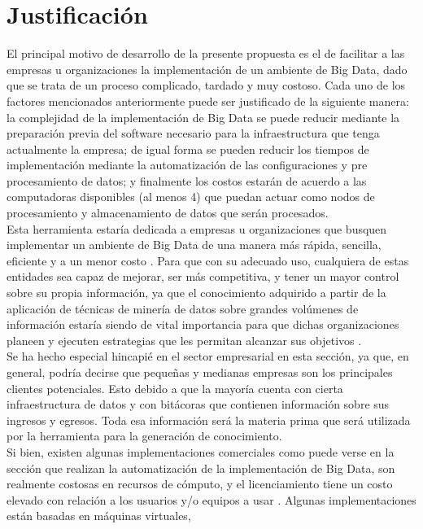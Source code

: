\section{Justificación}
El principal motivo de desarrollo de la presente propuesta es el de facilitar a las empresas u organizaciones la implementación de
un ambiente de Big Data, dado que se trata de un proceso complicado, tardado y muy costoso. Cada uno de los
factores mencionados anteriormente puede ser justificado de la siguiente manera: la complejidad de la implementación de Big Data
se puede reducir mediante la preparación previa del software necesario para la infraestructura que tenga actualmente la empresa; de
igual forma se pueden reducir los tiempos de implementación mediante la automatización de las configuraciones y pre
procesamiento de datos; y finalmente los costos estarán de acuerdo a las computadoras disponibles (al menos 4) que puedan actuar
como nodos de procesamiento y almacenamiento de datos que serán procesados.
\\
Esta herramienta estaría dedicada a empresas u organizaciones que busquen implementar un ambiente de Big Data de una manera
más rápida, sencilla, eficiente y a un menor costo \cite{refi8}. Para que con su adecuado uso, cualquiera de estas entidades sea capaz de
mejorar, ser más competitiva, y tener un mayor control sobre su propia información, ya que el conocimiento adquirido a partir de
la aplicación de técnicas de minería de datos sobre grandes volúmenes de información estaría siendo de vital importancia para que
dichas organizaciones planeen y ejecuten estrategias que les permitan alcanzar sus objetivos \cite{refi7}.
\\
Se ha hecho especial hincapié en el sector empresarial en esta sección, ya que, en general, podría decirse que pequeñas y medianas
empresas son los principales clientes potenciales. Esto debido a que la mayoría cuenta con cierta infraestructura de datos y con
bitácoras que contienen información sobre sus ingresos y egresos. Toda esa información será la materia prima que será utilizada
por la herramienta para la generación de conocimiento.
\\
Si bien, existen algunas implementaciones comerciales como puede verse en la sección  que realizan la
automatización de la implementación de Big Data, son realmente costosas en recursos de cómputo, y el licenciamiento tiene un
costo elevado con relación a los usuarios y/o equipos a usar \cite{refi9}. Algunas implementaciones están basadas en máquinas virtuales,

